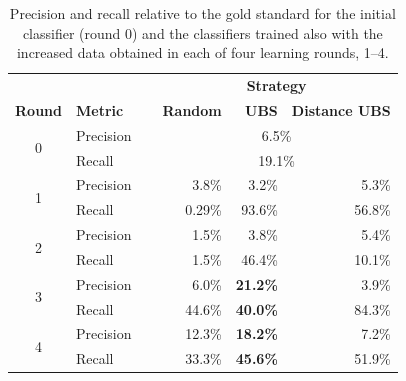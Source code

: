 \begin{table}[ht!]
\centering
\caption{Precision and recall relative to the gold standard for
the initial classifier (round 0) and the classifiers trained also with the increased data obtained in each of
four learning rounds, 1--4.\label{tab:pr_table}
}
\vspace{2ex}
\setlength\tabcolsep{6pt}
\begin{tabular}{|c| l | r | r | r |}
\hline
& & \multicolumn{3}{c|}{\textbf{Strategy}} \\
 \textbf{Round} & \textbf{Metric} & \textbf{Random} & \textbf{UBS}  & \textbf{Distance UBS}  \\
\hline
\multirow{2}{*}{0} & Precision &        \multicolumn{3}{c|}{6.5\%} \\
 & Recall\ \ \ \ \ &               \multicolumn{3}{c|}{19.1\%} \\
\hline
\multirow{2}{*}{1}  & Precision     & 3.8\%       &      3.2\%      &  5.3\% \\
 & Recall\ \ \ \ \ & 0.29\%      &   93.6\%     &  56.8\% \\
\hline
\multirow{2}{*}{2} & Precision      & 1.5\%           &      3.8\%      &  5.4\% \\
& Recall\ \ \ \ \ & 1.5\%           &    46.4\%      &  10.1\% \\
\hline
\multirow{2}{*}{3}  & Precision      & 6.0\%              &    \textbf{21.2\%}      &  3.9\% \\
 & Recall\ \ \ \ \ & 44.6\%            &    \textbf{40.0\%}     &  84.3\%  \\
\hline
\multirow{2}{*}{4} & Precision     & 12.3\%          &    \textbf{18.2\%}      &  7.2\% \\
& Recall\ \ \ \ \ & 33.3\%         &     \textbf{45.6\%}     &  51.9\% \\
\hline
\end{tabular}
\end{table}


